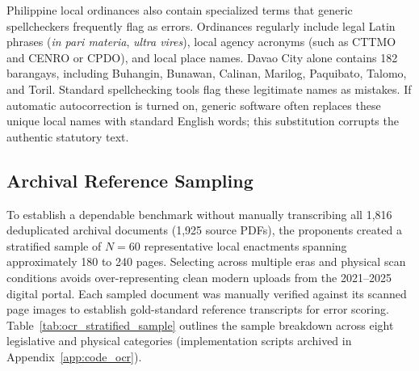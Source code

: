 Philippine local ordinances also contain specialized terms that generic spellcheckers frequently flag as errors. Ordinances regularly include legal Latin phrases (\textit{in pari materia}, \textit{ultra vires}), local agency acronyms (such as CTTMO and CENRO or CPDO), and local place names. Davao City alone contains 182 barangays, including Buhangin, Bunawan, Calinan, Marilog, Paquibato, Talomo, and Toril. Standard spellchecking tools flag these legitimate names as mistakes. If automatic autocorrection is turned on, generic software often replaces these unique local names with standard English words; this substitution corrupts the authentic statutory text.


\subsection{Archival Reference Sampling}
To establish a dependable benchmark without manually transcribing all 1,816 deduplicated archival documents (1,925 source PDFs), the proponents created a stratified sample of $N = 60$ representative local enactments spanning approximately 180 to 240 pages. Selecting across multiple eras and physical scan conditions avoids over-representing clean modern uploads from the 2021--2025 digital portal. Each sampled document was manually verified against its scanned page images to establish gold-standard reference transcripts for error scoring. Table~\ref{tab:ocr_stratified_sample} outlines the sample breakdown across eight legislative and physical categories (implementation scripts archived in Appendix~\ref{app:code_ocr}).

